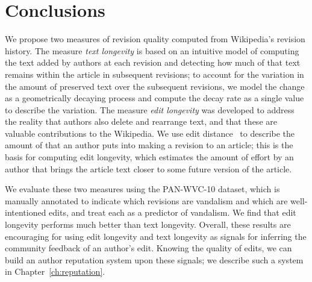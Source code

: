 \section{Conclusions}

We propose two measures of revision quality computed
from Wikipedia's revision history.
The measure \textit{text longevity} is based on an intuitive
model of computing the text added by authors at each revision
and detecting how much of that text remains within the article
in subsequent revisions; to account for the variation in
the amount of preserved text over the subsequent revisions,
we model the change as a geometrically decaying process
and compute the decay rate as a single value to describe
the variation.
The measure \textit{edit longevity} was developed to address
the reality that authors also delete and rearrange text,
and that these are valuable contributions to the Wikipedia.
We use edit distance~\cite{Levenshtein1966} to describe the
amount of  that an author puts into making a
revision to an article; this is the basis for computing
edit longevity, which estimates the amount of effort by an
author that brings the article text closer to some future
version of the article.

We evaluate these two measures using the PAN-WVC-10 dataset, which is
manually annotated to indicate which revisions are vandalism and which
are well-intentioned edits, and treat each as a predictor of vandalism.
We find that edit longevity performs much better than text longevity.
Overall, these results are encouraging for using edit longevity and text
longevity as signals for inferring the community feedback of an author's
edit.  Knowing the quality of edits, we can build an author reputation
system upon these signals; we describe such a system in
Chapter~\ref{ch:reputation}.

